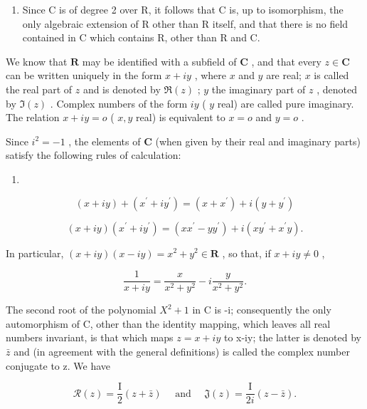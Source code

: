 \begin{enumerate}
\def\labelenumi{\arabic{enumi})}
\setcounter{enumi}{1}
\tightlist
\item
  Since C is of degree 2 over R, it follows that C is, up to isomorphism, the only algebraic extension of R other than R itself, and that there is no field contained in C which contains R, other than R and C.
\end{enumerate}

We know that \(\mathbf{R}\) may be identified with a subfield of \(\mathbf{C}\) , and that every \(z \in \mathbf{C}\) can be written uniquely in the form \(x + iy\) , where \(x\) and \(y\) are real; \(x\) is called the real part of \(z\) and is denoted by \(\Re(z)\) ; \(y\) the imaginary part of \(z\) , denoted by \(\Im(z)\) . Complex numbers of the form \(iy\) ( \(y\) real) are called pure imaginary. The relation \(x + iy = o\) ( \(x, y\) real) is equivalent to \(x = o\) and \(y = o\) .

Since \(i^2 = -1\) , the elements of \(\mathbf{C}\) (when given by their real and imaginary parts) satisfy the following rules of calculation:

\begin{enumerate}
\def\labelenumi{(\arabic{enumi})}
\tightlist
\item
\end{enumerate}

\[
(x + i y) + (x ^ {\prime} + i y ^ {\prime}) = (x + x ^ {\prime}) + i (y + y ^ {\prime})\tag{2}
\]

\[
(x + i y) (x ^ {\prime} + i y ^ {\prime}) = (x x ^ {\prime} - y y ^ {\prime}) + i (x y ^ {\prime} + x ^ {\prime} y).
\]

In particular, \((x + iy)(x - iy) = x^{2} + y^{2}\in \mathbf{R}\) , so that, if \(x + iy\neq 0\) ,

\[
\frac {1}{x + i y} = \frac {x}{x ^ {2} + y ^ {2}} - i \frac {y}{x ^ {2} + y ^ {2}}.\tag{3}
\]

The second root of the polynomial \(X^{2}+1\) in C is -i; consequently the only automorphism of C, other than the identity mapping, which leaves all real numbers invariant, is that which maps \(z=x+iy\) to x-iy; the latter is denoted by \(\bar{z}\) and (in agreement with the general definitions) is called the complex number conjugate to z. We have

\[
\mathcal {R} (z) = \frac {\mathrm{I}}{2} (z + \bar {z}) \quad \text { and } \quad \mathfrak {J} (z) = \frac {\mathrm{I}}{2 i} (z - \bar {z}).
\]

